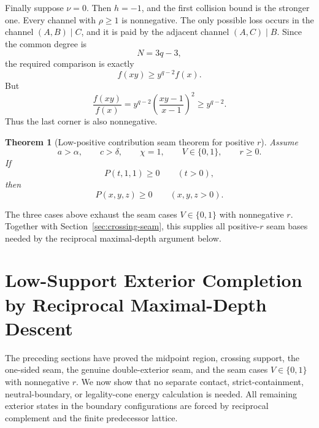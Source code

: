 \documentclass[11pt]{article}
\newtheorem{theorem}{Theorem}[section]
\theoremstyle{definition}
\begin{document}
Finally suppose \(\nu=0\).  Then \(h=-1\), and the first collision bound is the stronger one.  Every channel with \(\rho\ge1\) is nonnegative.  The only possible loss occurs in the channel \((A,B)\mid C\), and it is paid by the adjacent channel \((A,C)\mid B\).  Since the common degree is
\begin{equation*}
N=3q-3,
\end{equation*}
the required comparison is exactly
\begin{equation*}
f(xy)\ge y^{q-2}f(x).
\end{equation*}
But
\begin{equation*}
\frac{f(xy)}{f(x)}
=
y^{q-2}
\left(
\frac{xy-1}{x-1}
\right)^2
\ge y^{q-2}.
\end{equation*}
Thus the last corner is also nonnegative.

\begin{theorem}[Low-positive contribution seam theorem for positive \(r\)]
\label{thm:seam-v01-positive-r}
Assume
\begin{equation*}
a>\alpha,\qquad
c>\delta,\qquad
\chi=1,\qquad
V\in\{0,1\},\qquad
r\ge0.
\end{equation*}
If
\begin{equation*}
P(t,1,1)\ge0
\qquad(t>0),
\end{equation*}
then
\begin{equation*}
P(x,y,z)\ge0
\qquad(x,y,z>0).
\end{equation*}
\end{theorem}

The three cases above exhaust the seam cases \(V\in\{0,1\}\) with nonnegative \(r\).  Together with Section~\ref{sec:crossing-seam}, this supplies all positive-\(r\) seam bases needed by the reciprocal maximal-depth argument below.


\section{Low-Support Exterior Completion by Reciprocal Maximal-Depth Descent}
\label{sec:one-sided-completion}

The preceding sections have proved the midpoint region, crossing support, the one-sided seam, the genuine double-exterior seam, and the seam cases \(V\in\{0,1\}\) with nonnegative \(r\).  We now show that no separate contact, strict-containment, neutral-boundary, or legality-cone energy calculation is needed.  All remaining exterior states in the boundary configurations are forced by reciprocal complement and the finite predecessor lattice.
\end{document}
